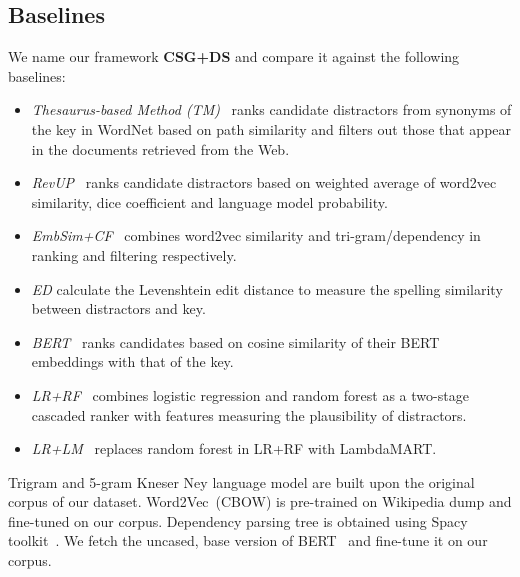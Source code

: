 \subsection{Baselines}
We name our framework \textbf{CSG+DS} and compare it against the following baselines:
\begin{itemize}
	\item \textit{Thesaurus-based Method (TM)}~\cite{sumita2005measuring} ranks candidate distractors from synonyms of the key in WordNet based on path similarity and filters out those that appear in the documents retrieved from the Web. 
	\item \textit{RevUP}~\cite{Kumar2015RevUP} ranks candidate distractors based on weighted average of word2vec similarity, dice coefficient and language model probability.
	\item \textit{EmbSim+CF}~\cite{jiang2017distractor} combines word2vec similarity and tri-gram/dependency in ranking and filtering respectively.
	\item \textit{ED} calculate the Levenshtein edit distance to measure the spelling similarity between distractors and key.
	\item \textit{BERT}~\cite{devlin2018bert} ranks candidates based on cosine similarity of their BERT embeddings with that of the key.
	\item \textit{LR+RF}~\cite{liang2018distractor} combines logistic regression and random forest as a two-stage cascaded ranker with features measuring the plausibility of distractors.
	\item \textit{LR+LM}~\cite{liang2018distractor} replaces random forest in LR+RF with LambdaMART.
\end{itemize}
Trigram and 5-gram Kneser Ney language model are built upon the original corpus of our dataset. Word2Vec~(CBOW) is pre-trained on Wikipedia dump and fine-tuned on our corpus. Dependency parsing tree is obtained using Spacy toolkit~\cite{spacy2}. We fetch the uncased, base version of BERT~\cite{Wolf2019HuggingFacesTS} and fine-tune it on our corpus.


